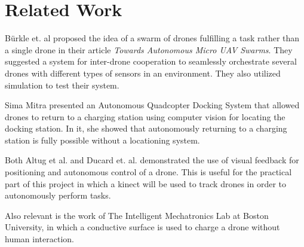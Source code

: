 \section{Related Work}
Bürkle et. al proposed the idea of a swarm of drones fulfilling a task rather than a single drone in their article \textit{Towards Autonomous Micro UAV Swarms}\cite{burkleetal}. They suggested a system for inter-drone cooperation to seamlessly orchestrate several drones with different types of sensors in an environment. They also utilized simulation to test their system.

Sima Mitra presented an Autonomous Quadcopter Docking System\cite{simamitra} that allowed drones to return to a charging station using computer vision for locating the docking station. In it, she showed that autonomously returning to a charging station is fully possible without a locationing system.

Both Altug et al.\cite{altugetal} and Ducard et. al.\cite{ducardetal} demonstrated the use of visual feedback for positioning and autonomous control of a drone. This is useful for the practical part of this project in which a kinect will be used to track drones in order to autonomously perform tasks.

Also relevant is the work of The Intelligent Mechatronics Lab at Boston University, in which a conductive surface is used to charge a drone without human interaction\cite{bostonuni}.

